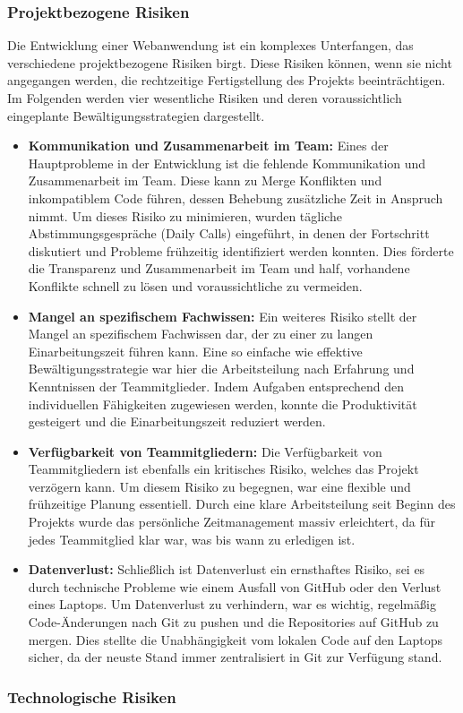 \documentclass[../main.tex]{subfiles} %
\begin{document}
\subsubsection{Projektbezogene Risiken} %

Die Entwicklung einer Webanwendung ist ein komplexes Unterfangen, das verschiedene projektbezogene Risiken birgt. Diese Risiken
können, wenn sie nicht angegangen werden, die rechtzeitige Fertigstellung des Projekts beeinträchtigen. Im Folgenden werden vier
wesentliche Risiken und deren voraussichtlich eingeplante Bewältigungsstrategien dargestellt.

\begin{itemize}

	\item \textbf{Kommunikation und Zusammenarbeit im Team:}
	      Eines der Hauptprobleme in der Entwicklung ist die fehlende Kommunikation und Zusammenarbeit im Team. Diese kann zu Merge
	      Konflikten und inkompatiblem Code führen, dessen Behebung zusätzliche Zeit in Anspruch nimmt. Um dieses Risiko zu minimieren,
	      wurden tägliche Abstimmungsgespräche (Daily Calls) eingeführt, in denen der Fortschritt diskutiert und Probleme frühzeitig
	      identifiziert werden konnten. Dies förderte die Transparenz und Zusammenarbeit im Team und half, vorhandene Konflikte schnell
	      zu lösen und voraussichtliche zu vermeiden.

	\item \textbf{Mangel an spezifischem Fachwissen:}
	      Ein weiteres Risiko stellt der Mangel an spezifischem Fachwissen dar, der zu einer zu langen Einarbeitungszeit führen kann. Eine
	      so einfache wie effektive Bewältigungsstrategie war hier die Arbeitsteilung nach Erfahrung und Kenntnissen der Teammitglieder.
	      Indem Aufgaben entsprechend den individuellen Fähigkeiten zugewiesen werden, konnte die Produktivität gesteigert und die Einarbeitungszeit
	      reduziert werden.

	\item \textbf{Verfügbarkeit von Teammitgliedern:}
	      Die Verfügbarkeit von Teammitgliedern ist ebenfalls ein kritisches Risiko, welches das Projekt verzögern kann. Um diesem Risiko zu begegnen,
	      war eine flexible und frühzeitige Planung essentiell. Durch eine klare Arbeitsteilung seit Beginn des Projekts wurde das persönliche
	      Zeitmanagement massiv erleichtert, da für jedes Teammitglied klar war, was bis wann zu erledigen ist.

	\item \textbf{Datenverlust:}
	      Schließlich ist Datenverlust ein ernsthaftes Risiko, sei es durch technische Probleme wie einem Ausfall von GitHub oder den Verlust eines
	      Laptops. Um Datenverlust zu verhindern, war es wichtig, regelmäßig Code-Änderungen nach Git zu pushen und die Repositories auf GitHub zu
	      mergen. Dies stellte die Unabhängigkeit vom lokalen Code auf den Laptops sicher, da der neuste Stand immer zentralisiert in Git zur
	      Verfügung stand.

\end{itemize}

\subsubsection{Technologische Risiken} %
\end{document}
